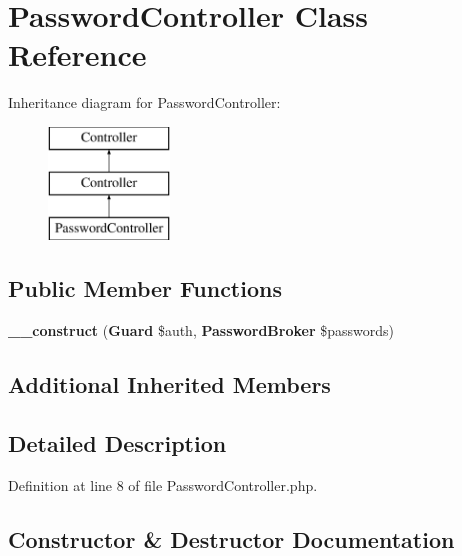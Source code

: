 \section{Password\+Controller Class Reference}
\label{class_app_1_1_http_1_1_controllers_1_1_auth_1_1_password_controller}
Inheritance diagram for Password\+Controller\+:\begin{figure}[H]
\begin{center}
\leavevmode
\includegraphics[height=3.000000cm]{class_app_1_1_http_1_1_controllers_1_1_auth_1_1_password_controller}
\end{center}
\end{figure}
\subsection*{Public Member Functions}
\begin{DoxyCompactItemize}
\item 
{\bf \+\_\+\+\_\+construct} ({\bf Guard} \$auth, {\bf Password\+Broker} \$passwords)
\end{DoxyCompactItemize}
\subsection*{Additional Inherited Members}


\subsection{Detailed Description}


Definition at line 8 of file Password\+Controller.\+php.



\subsection{Constructor \& Destructor Documentation}
